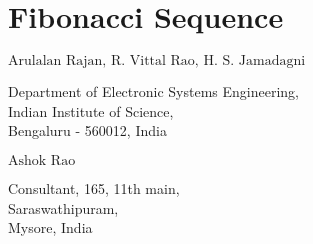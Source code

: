 \chapter{Fibonacci Sequence}




\vskip 0.8cm

\begin{center}
{\large\uppercase{$\text{Arulalan Rajan, R. Vittal Rao, H. S. Jamadagni}$}} 

\vskip -6pt

Department of Electronic Systems Engineering,\\ Indian Institute of Science,\\ Bengaluru - 560012, India 

\end{center}

\vskip 2cm

\begin{center}
{\large\uppercase{$\text{Ashok Rao}$}} 

\vskip -6pt

Consultant, 165, 11th main,\\ Saraswathipuram,\\ Mysore, India

\end{center}



\vfill




\newpage

